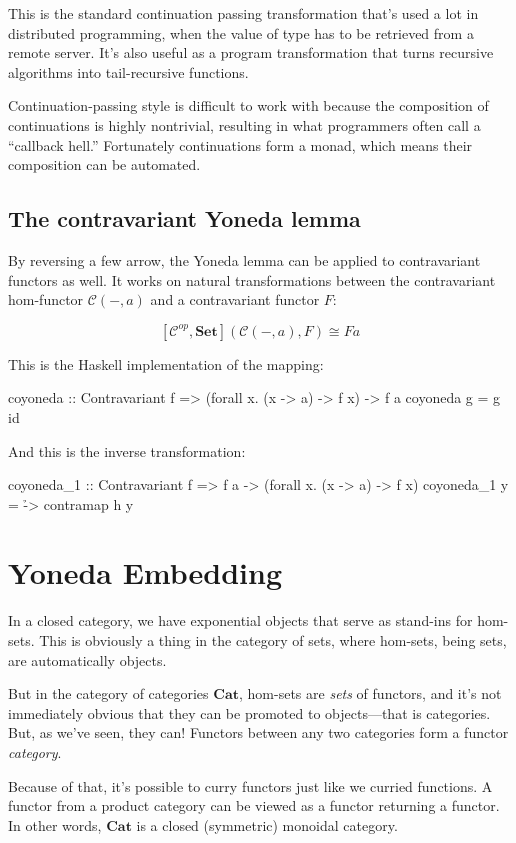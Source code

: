 \documentclass[DaoFP]{subfiles}
\begin{document}
This is the standard continuation passing transformation that's used a lot in distributed programming, when the value of type  has to be retrieved from a remote server. It's also useful as a program transformation that turns recursive algorithms into tail-recursive functions.

Continuation-passing style is difficult to work with because the composition of continuations is highly nontrivial, resulting in what programmers often call a ``callback hell.'' Fortunately continuations form a monad, which means their composition can be automated.

\subsection{The contravariant Yoneda lemma}

By reversing a few arrow, the Yoneda lemma can be applied to contravariant functors as well. It works on natural transformations between the contravariant hom-functor $\mathcal{C}(-, a)$ and a contravariant functor $F$:

\[ [\mathcal{C}^{op}, \mathbf{Set}]( \mathcal{C}(-, a), F) \cong F a \]

This is the Haskell implementation of the mapping:
\begin{haskell}
coyoneda :: Contravariant f => (forall x. (x -> a) -> f x) -> f a
coyoneda g = g id
\end{haskell}
And this is the inverse transformation:
\begin{haskell}
coyoneda_1 :: Contravariant f => f a -> (forall x. (x -> a) -> f x)
coyoneda_1 y = \h -> contramap h y
\end{haskell}

\section{Yoneda Embedding}

In a closed category, we have exponential objects that serve as stand-ins for hom-sets. This is obviously a thing in the category of sets, where hom-sets, being sets, are automatically objects. 

But in the category of categories  $\mathbf{Cat}$, hom-sets are \emph{sets} of functors, and it's not immediately obvious that they can be promoted to objects---that is categories. But, as we've seen, they can! Functors between any two categories form a functor \emph{category}.

Because of that, it's possible to curry functors just like we curried functions. A functor from a product category can be viewed as a functor returning a functor. In other words, $\mathbf{Cat}$ is a closed (symmetric) monoidal category.
\end{document}
